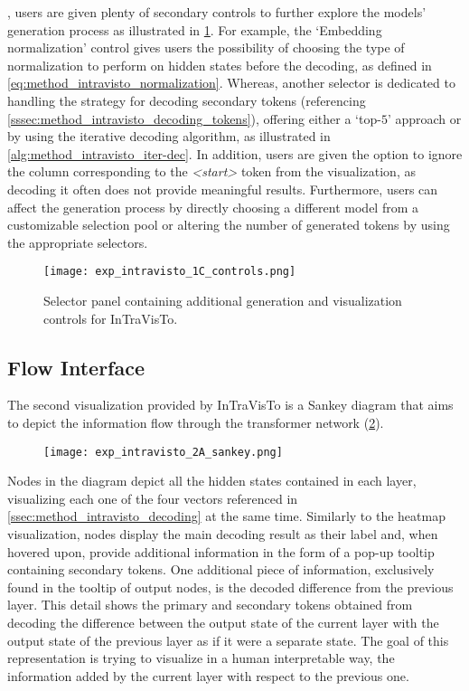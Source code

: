 , users are given plenty of secondary controls to further explore the models' generation process as illustrated in \cref{fig:exp_intravisto_1_C}.
For example, the `Embedding normalization' control gives users the possibility of choosing the type of normalization to perform on hidden states before the decoding, as defined in \cref{eq:method_intravisto_normalization}.
Whereas, another selector is dedicated to handling the strategy for decoding secondary tokens (referencing \cref{sssec:method_intravisto_decoding_tokens}), offering either a `top-$5$' approach or by using the iterative decoding algorithm, as illustrated in \cref{alg:method_intravisto_iter-dec}.
In addition, users are given the option to ignore the column corresponding to the \emph{<start>} token from the visualization, as decoding it often does not provide meaningful results.
Furthermore, users can affect the generation process by directly choosing a different model from a customizable selection pool or altering the number of generated tokens by using the appropriate selectors.

\begin{figure}[t!]
    \centering
    \texttt{[image: exp\_intravisto\_1C\_controls.png]}
    \caption{Selector panel containing additional generation and visualization controls for InTraVisTo.}
    \label{fig:exp_intravisto_1_C}
\end{figure}

\subsection{Flow Interface}\label{sec:exp_intravisto_exp2}

The second visualization provided by InTraVisTo is a Sankey diagram that aims to depict the information flow through the transformer network (\cref{fig:exp_intravisto_2_A}).

\begin{figure}[t!]
    \centering
    \texttt{[image: exp\_intravisto\_2A\_sankey.png]}
    \caption{}
    \label{fig:exp_intravisto_2_A}
\end{figure}

Nodes in the diagram depict all the hidden states contained in each layer, visualizing each one of the four vectors referenced in \cref{ssec:method_intravisto_decoding} at the same time.
Similarly to the heatmap visualization, nodes display the main decoding result as their label and, when hovered upon, provide additional information in the form of a pop-up tooltip containing secondary tokens.
One additional piece of information, exclusively found in the tooltip of output nodes, is the decoded difference from the previous layer.
This detail shows the primary and secondary tokens obtained from decoding the difference between the output state of the current layer with the output state of the previous layer as if it were a separate state.
The goal of this representation is trying to visualize in a human interpretable way, the information added by the current layer with respect to the previous one.

